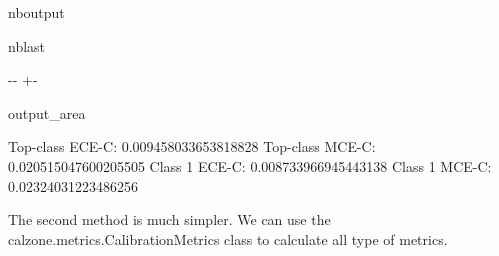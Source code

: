 \documentclass[letterpaper,10pt,english]{sphinxmanual}
\begin{document}
\begin{sphinxuseclass}{nboutput}
\begin{sphinxuseclass}{nblast}
{

\kern-\sphinxverbatimsmallskipamount\kern-\baselineskip
\kern+\FrameHeightAdjust\kern-\fboxrule
\vspace{\nbsphinxcodecellspacing}

\begin{sphinxuseclass}{output_area}
\begin{sphinxuseclass}{}


\begin{sphinxVerbatim}[commandchars=\\\{\}]
Top-class ECE-C:  0.009458033653818828
Top-class MCE-C:  0.020515047600205505
Class 1 ECE-C:  0.008733966945443138
Class 1 MCE-C:  0.02324031223486256
\end{sphinxVerbatim}



\end{sphinxuseclass}
\end{sphinxuseclass}
}

\end{sphinxuseclass}
\end{sphinxuseclass}
\sphinxAtStartPar
The second method is much simpler. We can use the calzone.metrics.CalibrationMetrics class to calculate all type of metrics.
\end{document}
